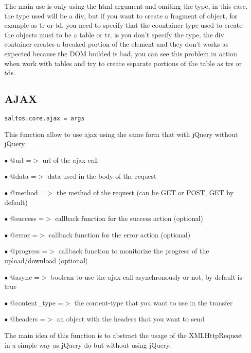 \documentclass[a4paper]{book}
\begin{document}
The main use is only using the html argument and omiting the type, in this case, the
type used will be a div, but if you want to create a fragment of object, for example
as tr or td, you need to specify that the coontainer type used to create the objects
must to be a table or tr, is you don't specify the type, the div container creates
a breaked portion of the element and they don't works as expected because the DOM
builded is bad, you can see this problem in action when work with tables and try to
create separate portions of the table as trs or tds.

\hypertarget{toc488}{}
\subsection{AJAX}

\begin{lstlisting}
saltos.core.ajax = args
\end{lstlisting}

This function allow to use ajax using the same form that with jQuery without jQuery

\begin{compactitem}
\item[\color{myblue}$\bullet$] @url          =$>$ url of the ajax call
\item[\color{myblue}$\bullet$] @data         =$>$ data used in the body of the request
\item[\color{myblue}$\bullet$] @method       =$>$ the method of the request (can be GET or POST, GET by default)
\item[\color{myblue}$\bullet$] @success      =$>$ callback function for the success action (optional)
\item[\color{myblue}$\bullet$] @error        =$>$ callback function for the error action (optional)
\item[\color{myblue}$\bullet$] @progress     =$>$ callback function to monitorize the progress of the upload/download (optional)
\item[\color{myblue}$\bullet$] @async        =$>$ boolean to use the ajax call asynchronously or not, by default is true
\item[\color{myblue}$\bullet$] @content\_type =$>$ the content-type that you want to use in the transfer
\item[\color{myblue}$\bullet$] @headers      =$>$ an object with the headers that you want to send
\end{compactitem}

The main idea of this function is to abstract the usage of the XMLHttpRequest in a simple
way as jQuery do but without using jQuery.
\end{document}
